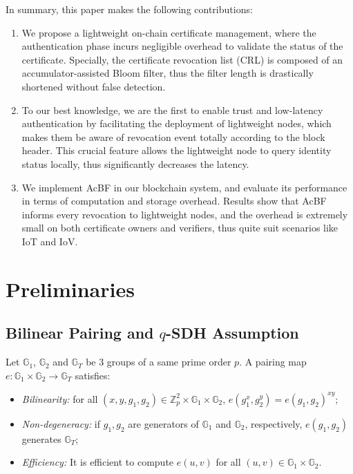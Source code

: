 \documentclass[conference]{IEEEtran}
\begin{document}
In summary, this paper makes the following contributions:
\begin{enumerate}
	\item We propose a lightweight on-chain certificate management, where the authentication phase incurs negligible overhead to validate the status of the certificate. Specially, the certificate revocation list (CRL) is composed of an accumulator-assisted Bloom filter, thus the filter length is drastically shortened without false detection. 
	\item To our best knowledge, we are the first to enable trust and low-latency authentication by facilitating the deployment of lightweight nodes, which makes them be aware of revocation event totally according to the block header. This crucial feature allows the lightweight node to query identity status locally, thus significantly decreases the latency.
	\item We implement AcBF in our blockchain system, and evaluate its performance in terms of computation and storage overhead. Results show that AcBF informs every revocation to lightweight nodes, and the overhead is extremely small on both certificate owners and verifiers, thus quite suit scenarios like IoT and IoV.
\end{enumerate}



\section{Preliminaries}\label{sec:preliminary}

\subsection{Bilinear Pairing and $q$-SDH Assumption}
Let $\mathbb{G}_1$, $\mathbb{G}_2$ and $\mathbb{G}_T$ be 3 groups of a same prime order $p$. A pairing map $e:\mathbb{G}_1\times \mathbb{G}_2\rightarrow\mathbb{G}_T$ satisfies:
\begin{itemize}
	\item \textit{Bilinearity:} for all $(x,y, g_1, g_2) \in \mathbb{Z}_p^2\times \mathbb{G}_1\times \mathbb{G}_2$, $e(g_1^x, g_2^y) = e(g_1, g_2)^{xy}$;
	\item \textit{Non-degeneracy:} if $g_1, g_2$ are generators of $\mathbb{G}_1$ and $\mathbb{G}_2$, respectively, $e(g_1, g_2)$ generates $\mathbb{G}_T$;
	\item \textit{Efficiency:} It is efficient to compute $e(u,v)$ for all $(u, v) \in \mathbb{G}_1\times \mathbb{G}_2$.
\end{itemize}
\end{document}
